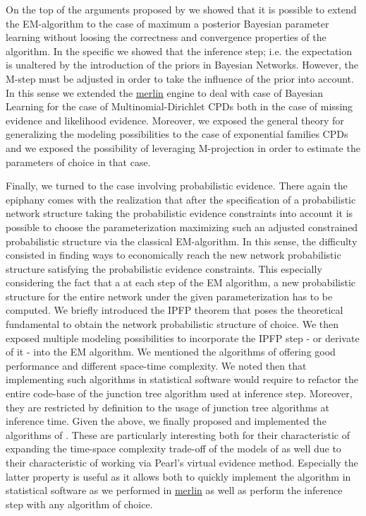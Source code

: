 \documentclass[11pt]{article}
\begin{document}
\begin{article}
On the top of the arguments proposed by \cite{Wasserkrug_all} we
showed that it is possible to extend the EM-algorithm to the case of
maximum a posterior Bayesian parameter learning without loosing the
correctness and convergence properties of the algorithm. In the
specific we showed that the inference step; i.e. the expectation is
unaltered by the introduction of the priors in Bayesian
Networks. However, the M-step must be adjusted in order to take the
influence of the prior into account. In this sense we extended the
\href{https://github.com/radum2275/merlin}{merlin} engine to deal with case of Bayesian Learning for the case of
Multinomial-Dirichlet CPDs both in the case of missing evidence and
likelihood evidence. Moreover, we exposed the general theory for
generalizing the modeling possibilities to the case of exponential
families CPDs and we exposed the possibility of leveraging
M-projection in order to estimate the parameters of choice in that
case.

Finally, we turned to the case involving probabilistic
evidence. There again the epiphany comes with the realization that
after the specification of a probabilistic network structure taking
the probabilistic evidence constraints into account it is possible
to choose the parameterization maximizing such an adjusted
constrained probabilistic structure via the classical EM-algorithm.
In this sense, the difficulty consisted in finding ways to
economically reach the new network probabilistic structure
satisfying the probabilistic evidence constraints. This especially
considering the fact that a at each step of the EM algorithm, a new
probabilistic structure for the entire network under the given
parameterization has to be computed. We briefly introduced the IPFP
theorem that poses the theoretical fundamental to obtain the network
probabilistic structure of choice. We then exposed multiple modeling
possibilities to incorporate the IPFP step - or derivate of it -
into the EM algorithm. We mentioned the algorithms of
\cite{Valtorta_2002} offering good performance and different
space-time complexity. We noted then that implementing such
algorithms in statistical software would require to refactor the
entire code-base of the junction tree algorithm used at inference
step. Moreover, they are restricted by definition to the usage of
junction tree algorithms at inference time. Given the above, we
finally proposed and implemented the algorithms of
\cite{PENG_2010}. These are particularly interesting both for their
characteristic of expanding the time-space complexity trade-off
of the models of \cite{Valtorta_2002} as well due to their
characteristic of working via Pearl's virtual evidence
method. Especially the latter property is useful as it allows both
to quickly implement the algorithm in statistical software as we
performed in \href{https://github.com/radum2275/merlin}{merlin} as well as perform the inference step with any
algorithm of choice.


\end{article}
\end{document}
